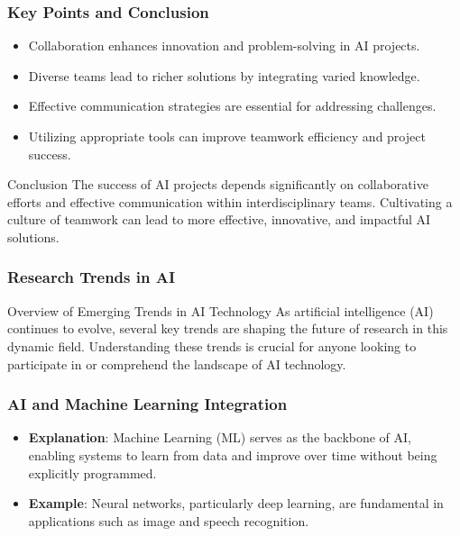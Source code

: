 \documentclass[aspectratio=169]{beamer}
\begin{document}
\begin{frame}[fragile]
    \frametitle{Key Points and Conclusion}
    \begin{itemize}
        \item Collaboration enhances innovation and problem-solving in AI projects.
        \item Diverse teams lead to richer solutions by integrating varied knowledge.
        \item Effective communication strategies are essential for addressing challenges.
        \item Utilizing appropriate tools can improve teamwork efficiency and project success.
    \end{itemize}
    
    \begin{block}{Conclusion}
        The success of AI projects depends significantly on collaborative efforts and effective communication within interdisciplinary teams. Cultivating a culture of teamwork can lead to more effective, innovative, and impactful AI solutions.
    \end{block}
\end{frame}

\begin{frame}[fragile]
    \frametitle{Research Trends in AI}
    \begin{block}{Overview of Emerging Trends in AI Technology}
        As artificial intelligence (AI) continues to evolve, several key trends are shaping the future of research in this dynamic field. Understanding these trends is crucial for anyone looking to participate in or comprehend the landscape of AI technology.
    \end{block}
\end{frame}

\begin{frame}[fragile]
    \frametitle{AI and Machine Learning Integration}
    \begin{itemize}
        \item \textbf{Explanation}: Machine Learning (ML) serves as the backbone of AI, enabling systems to learn from data and improve over time without being explicitly programmed.
        \item \textbf{Example}: Neural networks, particularly deep learning, are fundamental in applications such as image and speech recognition.
    \end{itemize}
\end{frame}
\end{document}
